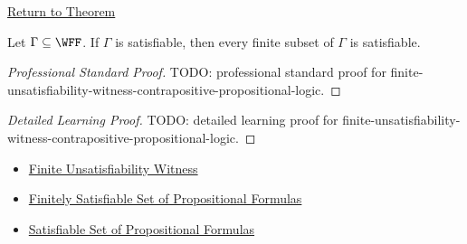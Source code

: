 \newpage
{}
\label{prf:finite-unsatisfiability-witness-contrapositive-propositional-logic}

\begin{remark*}[Return]
\hyperref[cor:finite-unsatisfiability-witness-contrapositive-propositional-logic]{Return to Theorem}
\end{remark*}

\begin{corollary*}
Let \(\Gamma\subseteq\WFF\). If \(\Gamma\) is satisfiable, then every finite
subset of \(\Gamma\) is satisfiable.

\medskip
\end{corollary*}

\begin{proof}[Professional Standard Proof]
\LRAProofBodyStart
TODO: professional standard proof for finite-unsatisfiability-witness-contrapositive-propositional-logic.
\end{proof}

\begin{proof}[Detailed Learning Proof]
\LRAProofBodyStart
TODO: detailed learning proof for finite-unsatisfiability-witness-contrapositive-propositional-logic.
\end{proof}

\begin{remark*}
\end{remark*}

\begin{dependencies}
\begin{itemize}
  \item \hyperref[thm:finite-unsatisfiability-witness-propositional-logic]{Finite Unsatisfiability Witness}
  \item \hyperref[def:finitely-satisfiable-set-of-propositional-formulas]{Finitely Satisfiable Set of Propositional Formulas}
  \item \hyperref[def:satisfiable-set-of-propositional-formulas]{Satisfiable Set of Propositional Formulas}
\end{itemize}
\end{dependencies}

\clearpage
